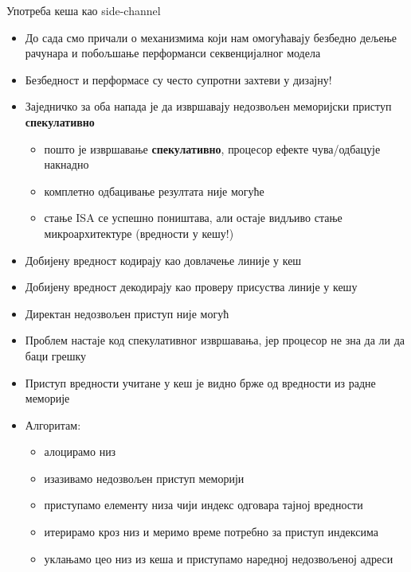\documentclass[xcolor=table]{beamer}
\begin{document}
    \begin{frame}[allowframebreaks]{Употреба кеша као side-channel}
        \begin{itemize}
            \item До сада смо причали о механизмима који нам омогућавају безбедно дељење рачунара и побољшање перформанси секвенцијалног модела
            \item Безбедност и перформасе су често супротни захтеви у дизајну!
            \item Заједничко за оба напада је да извршавају недозвољен меморијски приступ \textbf{спекулативно}
            \begin{itemize}
                \item пошто је извршавање \textbf{спекулативно}, процесор ефекте чува/одбацује накнадно
                \item комплетно одбацивање резултата није могуће
                \item стање ISA се успешно поништава, али остаје видљиво стање микроархитектуре (вредности у кешу!)
            \end{itemize}
            \item Добијену вредност кодирају као довлачење линије у кеш
            \item Добијену вредност декодирају као проверу присуства линије у кешу
        \end{itemize}
        
        \framebreak
        
        \begin{itemize}
            \item Директан недозвољен приступ није могућ
            \item Проблем настаје код спекулативног извршавања, јер процесор не зна да ли да баци грешку
            \item Приступ вредности учитане у кеш је видно брже од вредности из радне меморије
            \item Алгоритам:
            \begin{itemize}
                \item алоцирамо низ
                \item изазивамо недозвољен приступ меморији
                \item приступамо елементу низа чији индекс одговара тајној вредности
                \item итерирамо кроз низ и меримо време потребно за приступ индексима
                \item уклањамо цео низ из кеша и приступамо наредној недозвољеној адреси
            \end{itemize}
        \end{itemize}
        

\end{frame}
\end{document}
